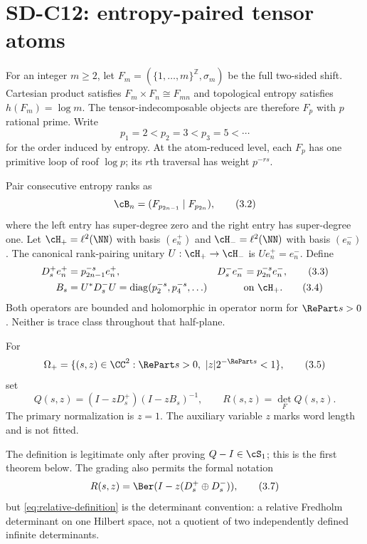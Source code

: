 \section{SD-C12: entropy-paired tensor atoms}
\label{sec:source}

For an integer $m\ge2$, let
$F_m=(\{1,\ldots,m\}^{\mathbb Z},\sigma_m)$ be the full two-sided shift.
Cartesian product satisfies $F_m\times F_n\cong F_{mn}$ and topological
entropy satisfies $h(F_m)=\log m$.  The tensor-indecomposable objects are
therefore $F_p$ with $p$ rational prime.  Write
\[
 p_1=2<p_2=3<p_3=5<\cdots                       \tag{3.1}
\]
for the order induced by entropy.  At the atom-reduced level, each $F_p$ has
one primitive loop of roof $\log p$; its $r$th traversal has weight $p^{-rs}$.

Pair consecutive entropy ranks as
\[
 \cB_n=(F_{p_{2n-1}}\mid F_{p_{2n}}),           \tag{3.2}
\]
where the left entry has super-degree zero and the right entry has
super-degree one.  Let $\cH_+=\ell^2(\NN)$ with basis $(e_n^+)$ and
$\cH_-=\ell^2(\NN)$ with basis $(e_n^-)$.  The canonical rank-pairing unitary
$U:\cH_+\to\cH_-$ is $Ue_n^+=e_n^-$.  Define
\begin{align}
 D_s^+e_n^+&=p_{2n-1}^{-s}e_n^+,&
 D_s^-e_n^-&=p_{2n}^{-s}e_n^-,                 \tag{3.3}\\
 B_s&=U^*D_s^-U
   =\operatorname{diag}(p_2^{-s},p_4^{-s},\ldots)
   &&\text{on }\cH_+.                          \tag{3.4}
\end{align}
Both operators are bounded and holomorphic in operator norm for
$\RePart s>0$.  Neither is trace class throughout that half-plane.

\begin{definition}
For
\[
 \Omega_+=\{(s,z)\in\CC^2:\RePart s>0,
                    \ |z|2^{-\RePart s}<1\},   \tag{3.5}
\]
set
\[
 Q(s,z)=(I-zD_s^+)(I-zB_s)^{-1},
 \qquad R(s,z)=\det_{F}Q(s,z).                 \tag{3.6}
 \label{eq:relative-definition}
\]
The primary normalization is $z=1$.  The auxiliary variable $z$ marks word
length and is not fitted.
\end{definition}

The definition is legitimate only after proving $Q-I\in\cS_1$; this is the
first theorem below.  The grading also permits the formal notation
\[
 R(s,z)=\Ber(I-z(D_s^+\oplus D_s^-)),          \tag{3.7}
\]
but \cref{eq:relative-definition} is the determinant convention: a relative
Fredholm determinant on one Hilbert space, not a quotient of two independently
defined infinite determinants.

